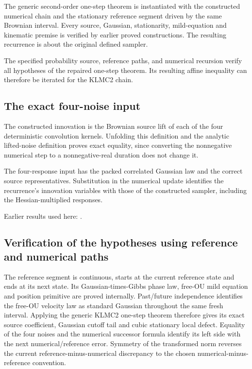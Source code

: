 \documentclass[11pt,a4paper]{report}
\begin{document}
The generic second-order one-step theorem is instantiated with the constructed numerical chain and the stationary reference segment driven by the same Brownian interval. Every source, Gaussian, stationarity, mild-equation and kinematic premise is verified by earlier proved constructions. The resulting recurrence is about the original defined sampler.



The specified probability source, reference paths, and numerical recursion verify all hypotheses of the repaired one-step theorem. Its resulting affine inequality can therefore be iterated for the KLMC2 chain.

\subsection{\texorpdfstring{The exact four-noise input}{The exact four-noise input}}
\label{report-step-KineticLangevin-CanonicalKLMC2Recurrence-lean-1}


The constructed innovation is the Brownian source lift of each of the four deterministic convolution kernels. Unfolding this definition and the analytic lifted-noise definition proves exact equality, since converting the nonnegative numerical step to a nonnegative-real duration does not change it.



The four-response input has the packed correlated Gaussian law and the correct source representatives. Substitution in the numerical update identifies the recurrence’s innovation variables with those of the constructed sampler, including the Hessian-multiplied responses.



Earlier results used here: \cite[Section~3.17.1]{LangevinLean2026ULASC}.
\subsection{\texorpdfstring{Verification of the hypotheses using reference and numerical paths}{Verification of the hypotheses using reference and numerical paths}}
\label{report-step-KineticLangevin-CanonicalKLMC2Recurrence-lean-2}


The reference segment is continuous, starts at the current reference state and ends at its next state. Its Gaussian-times-Gibbs phase law, free-OU mild equation and position primitive are proved internally. Past/\allowbreak{}future independence identifies the free-OU velocity law as standard Gaussian throughout the same fresh interval. Applying the generic KLMC2 one-step theorem therefore gives its exact source coefficient, Gaussian cutoff tail and cubic stationary local defect. Equality of the four noises and the numerical successor formula identify its left side with the next numerical/\allowbreak{}reference error. Symmetry of the transformed norm reverses the current reference-minus-numerical discrepancy to the chosen numerical-minus-reference convention.
\end{document}
